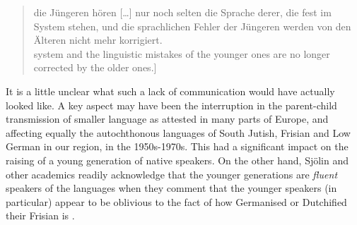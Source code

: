 \documentclass[output=paper]{langsci/langscibook}
\begin{document}
\begin{quote}
die Jüngeren hören […] nur noch selten die Sprache derer, die fest im System stehen, und die sprachlichen Fehler der Jüngeren werden von den Älteren nicht mehr korrigiert. \citep[470]{Sjolin1997}\bigskip\\\relax
[The younger ones only rarely hear the language of those who are firm in the [linguistic] system and the linguistic mistakes of the younger ones are no longer corrected by the older ones.]
\end{quote}

It is a little unclear what such a lack of communication would have actually looked like. A key aspect may have been the interruption in the parent-child transmission of smaller language as attested in many parts of Europe, and affecting equally the autochthonous languages of South Jutish, Frisian and Low German in our region, in the 1950s-1970s. This had a significant impact on the raising of a young generation of native speakers. On the other hand, Sjölin and other academics readily acknowledge that the younger generations are \textit{fluent} speakers of the languages when they comment that the younger speakers (in particular) appear to be oblivious to the fact of how Germanised or Dutchified their Frisian is \citep[471]{Sjolin1997}. 
\end{document}
